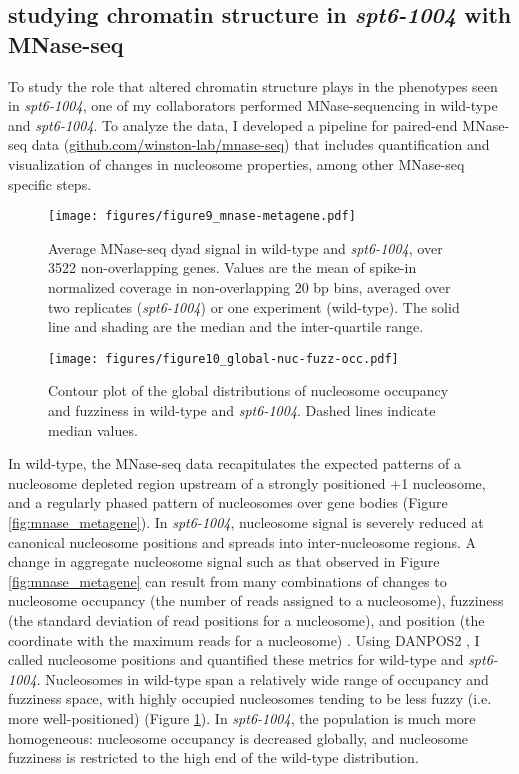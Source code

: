 \documentclass[9pt, letterpaper]{article}
\begin{document}
\subsection{studying chromatin structure in \textit{spt6-1004} with MNase-seq}

To study the role that altered chromatin structure plays in the phenotypes seen in \textit{spt6-1004}, one of my collaborators performed MNase-sequencing in wild-type and \textit{spt6-1004}. To analyze the data, I developed a pipeline for paired-end MNase-seq data (\href{https://github.com/winston-lab/mnase-seq}{github.com/winston-lab/mnase-seq}) that includes quantification and visualization of changes in nucleosome properties, among other MNase-seq specific steps.

\begin{figure}[H]
    \centering
    \begin{minipage}[t]{8.5cm}
        \centering
        \texttt{[image: figures/figure9\_mnase-metagene.pdf]}
        \caption{Average MNase-seq dyad signal in wild-type and \textit{spt6-1004}, over 3522 non-overlapping genes. Values are the mean of spike-in normalized coverage in non-overlapping 20 bp bins, averaged over two replicates (\textit{spt6-1004}) or one experiment (wild-type). The solid line and shading are the median and the inter-quartile range.}
        \label{fig:mnase_metagene}
    \end{minipage}\hfill
    \begin{minipage}[t]{8.5cm}
        \centering
        \texttt{[image: figures/figure10\_global-nuc-fuzz-occ.pdf]}
        \caption{Contour plot of the global distributions of nucleosome occupancy and fuzziness in wild-type and \textit{spt6-1004}. Dashed lines indicate median values.}
        \label{fig:global_nuc_fuzz}
    \end{minipage}
\end{figure}

In wild-type, the MNase-seq data recapitulates the expected patterns of a nucleosome depleted region upstream of a strongly positioned +1 nucleosome, and a regularly phased pattern of nucleosomes over gene bodies (Figure \ref{fig:mnase_metagene}). In \textit{spt6-1004}, nucleosome signal is severely reduced at canonical nucleosome positions and spreads into inter-nucleosome regions. A change in aggregate nucleosome signal such as that observed in Figure \ref{fig:mnase_metagene} can result from many combinations of changes to nucleosome occupancy (the number of reads assigned to a nucleosome), fuzziness (the standard deviation of read positions for a nucleosome), and position (the coordinate with the maximum reads for a nucleosome) \cite{chen2013}. Using DANPOS2 \cite{chen2013}, I called nucleosome positions and quantified these metrics for wild-type and \textit{spt6-1004}. Nucleosomes in wild-type span a relatively wide range of occupancy and fuzziness space, with highly occupied nucleosomes tending to be less fuzzy (i.e. more well-positioned) (Figure \ref{fig:global_nuc_fuzz}). In \textit{spt6-1004}, the population is much more homogeneous: nucleosome occupancy is decreased globally, and nucleosome fuzziness is restricted to the high end of the wild-type distribution.
\end{document}
